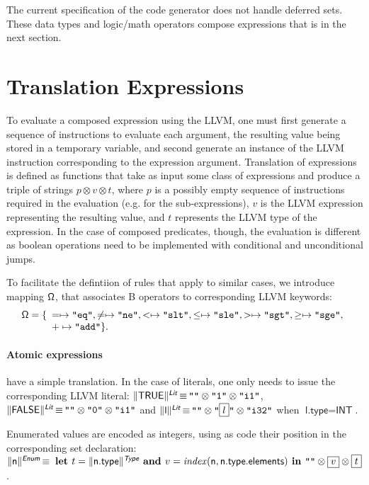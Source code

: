 \documentclass{llncs}
\newcommand{\trad}[2]{\ensuremath{\lVert \textsf{#1} \rVert^{\textit{#2}}}}
\DeclareMathOperator{\isdef}{\equiv}
\newcommand{\llvm}[1]{\texttt{#1}}
\newcommand{\B}[1]{\textsf{#1}}
\newcommand{\LET}[0]{\textbf{ let }}
\newcommand{\IN}[0]{\textbf{ in }}
\newcommand{\AND}[0]{\textbf{ and }}
\newcommand{\PH}[1]{\framebox{$#1$}}
\newcommand{\sep}[0]{\otimes}
\newcommand{\opmap}[0]{\ensuremath{\sf\Omega}}
\begin{document}
The current specification of the code generator does not handle deferred sets.
These data types and logic/math operators compose expressions that is in 
the next section.

\section{Translation Expressions}
\label{sec:expr}

To evaluate a composed expression using the LLVM, one must first generate a
sequence of instructions to evaluate each argument, the resulting value being
stored in a temporary variable, and second generate an instance of the LLVM
instruction corresponding to the expression argument.  Translation of
expressions is defined as functions that take as input some class of expressions
and produce a triple of strings $p \sep v \sep t$, where $p$ is a possibly empty
sequence of instructions required in the evaluation (e.g.  for the
sub-expressions), $v$ is the LLVM expression representing the resulting value,
and $t$ represents the LLVM type of the expression. In the case of composed
predicates, though, the evaluation is different as boolean operations need to be
implemented with conditional and unconditional jumps.

To facilitate the defintiion of rules that apply to similar cases, we introduce
mapping $\opmap$, that associates B operators to corresponding LLVM keywords:
$$\opmap = \{
\begin{array}[t]{l}
  = \mapsto \llvm{"eq"},
  \ne \mapsto \llvm{"ne"},
  < \mapsto \llvm{"slt"},
  \le \mapsto \llvm{"sle"},
  > \mapsto \llvm{"sgt"},
  \ge \mapsto \llvm{"sge"}, \\
  + \mapsto \llvm{"add"} \}.
  \end{array}
$$

\paragraph{Atomic expressions} have a simple translation. In the case of
literals, one only needs to issue the corresponding LLVM literal:
$\trad{TRUE}{\B{Lit}} \isdef \llvm{""} \sep \llvm{"1"} \sep \llvm{"i1"}$,
$\trad{FALSE}{\B{Lit}} \isdef \llvm{""} \sep \llvm{"0"} \sep \llvm{"i1"}$ and
$\trad{l}{\B{Lit}} \isdef \llvm{""} \sep \llvm{"\PH{l}"} \sep \llvm{"i32"}$ when
$\B{l.type} = \B{INT}$.

Enumerated values are encoded as integers, using as code their position in the
corresponding set declaration: $\trad{\B{n}}{\B{Enum}} \isdef \LET t =
\trad{\B{n.type}}{\B{Type}} \AND v = \mathit{index}(\B{n}, \B{n.type.elements})
\IN \llvm{""} \sep \PH{v} \sep \PH{t}$.
\end{document}

